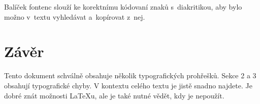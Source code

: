 \documentclass[a4paper, 10pt, twocolumn]{article}
\begin{document}
\par Balíček {\selectfont fontenc} slouží ke korektnímu kódovaní znaků s~diakritikou, aby bylo možno v~textu vyhledávat a~kopírovat z~nej.

\section{Závěr}

Tento dokument schválně obsahuje několik typografických
prohřešků. Sekce 2 a 3 obsahují typografické chyby. V kontextu
celého textu je jistě snadno najdete. Je dobré znát
možnosti \LaTeX{u}, ale je také nutné vědět, kdy je nepoužít.
\end{document}
